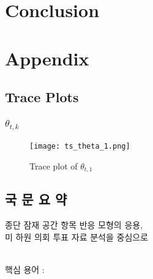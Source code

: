 \documentclass[a4paper, 11pt]{report}
\begin{document}
\chapter{Conclusion} \label{Chapter7}




\chapter{Appendix}\label{Appendix}

\section{Trace Plots}
\subsection{$\theta_{t,k}$}
\begin{figure}[h]
  \begin{center}
    \texttt{[image: ts\_theta\_1.png]}
  \end{center}
  \caption{Trace plot of $\theta_{t,1}$}
  \label{fig:ts_theta}
\end{figure}


\newpage

\section*{국 문 요 약}
\par
\bigskip

\begin{center}
\large
종단 잠재 공간 항목 반응 모형의 응용,\\
미 하원 의회 투표 자료 분석을 중심으로
\end{center}
\par
\bigskip
\noindent


\bigskip
\noindent \hrulefill\\
핵심 용어 :  \par


\newpage




\end{document}
